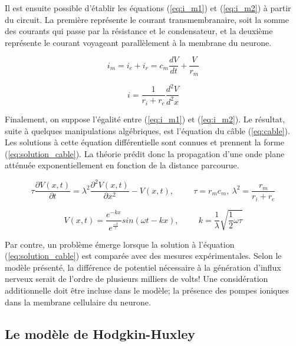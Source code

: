 \documentclass{article}
\begin{document}
Il est ensuite possible d'établir les équations (\ref{eq:i_m1}) et (\ref{eq:i_m2}) à partir du circuit. La première représente le courant transmembranaire, soit la somme des courants qui passe par la résistance et le condensateur, et la deuxième représente le courant voyageant parallèlement à la membrane du neurone.

\begin{equation}
\label{eq:i_m1}
i_m = i_c + i_r = c_m \frac{dV}{dt} + \frac{V}{r_m}
\end{equation}

\begin{equation}
\label{eq:i_m2}
i = \frac{1}{r_i + r_e} \frac{d^2V}{d^2x}
\end{equation}

Finalement, on suppose l'égalité entre (\ref{eq:i_m1}) et (\ref{eq:i_m2}). Le résultat, suite à quelques manipulations algébriques, est l'équation du câble (\ref{eq:cable}). Les solutions à cette équation différentielle sont connues et prennent la forme (\ref{eq:solution_cable}). La théorie prédit donc la propagation d'une onde plane atténuée exponentiellement en fonction de la distance parcourue.

\begin{equation}
	\label{eq:cable}
	\tau \frac{\partial V(x,t)}{\partial t} = \lambda^2\frac{\partial^2V(x,t)}{\partial x^2} - V(x,t), \hspace{1cm} \tau = r_mc_m, \  \lambda^2=\frac{r_m}{r_i+r_e}
\end{equation}

\begin{equation}
\label{eq:solution_cable}
	V(x,t) = \frac{e^{-kx}}{e^{\frac{-t}{\tau}}} sin(\omega t-kx), \hspace{1cm} k = \frac{1}{\lambda}\sqrt{\frac{1}{2}\omega \tau}
\end{equation}

Par contre, un problème émerge lorsque la solution à l'équation (\ref{eq:solution_cable}) est comparée avec des mesures expérimentales. Selon le modèle présenté, la différence de potentiel nécessaire à la génération d'influx nerveux serait de l'ordre de plusieurs milliers de volts! Une considération additionnelle doit être incluse dans le modèle; la présence des pompes ioniques dans la membrane cellulaire du neurone.


\subsection{Le modèle de Hodgkin-Huxley}\label{subsec:model}
\end{document}
